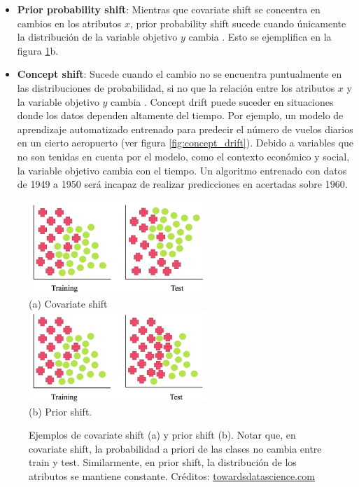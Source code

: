 \begin{itemize}
\item \textbf{Prior probability shift}: Mientras que covariate shift se concentra en cambios en los atributos $x$, prior probability shift sucede cuando únicamente  la distribución de la variable objetivo $y$ cambia \cite{quinonero2009dataset} \cite{MORENOTORRES2012521}. Esto se ejemplifica en la figura \ref{fig:ds_shift_sets}b.
\item \textbf{Concept shift}: Sucede cuando el cambio no se encuentra puntualmente en las distribuciones de probabilidad, si no que la relación entre los atributos $x$ y la variable objetivo $y$ cambia \cite{MORENOTORRES2012521} \cite{kouw2019introduction}. Concept drift puede suceder en situaciones donde los datos dependen altamente del tiempo. Por ejemplo, un modelo de aprendizaje automatizado entrenado para predecir el número de vuelos diarios en un cierto aeropuerto (ver figura \ref{fig:concept_drift}). Debido a variables que no son tenidas en cuenta por el modelo, como el contexto económico y social, la variable objetivo cambia con el tiempo. Un algoritmo entrenado con datos  de 1949 a 1950 será incapaz de realizar predicciones en acertadas sobre 1960.
\end{itemize} 

\begin{figure}[h!]
\centering
  \includegraphics[width=0.6\textwidth]{Kap8/covariate_shift.png} \\
  (a) Covariate shift \\
  \includegraphics[width=0.6\textwidth]{Kap8/prior_shift.png}  \\
  (b) Prior shift.

\caption{Ejemplos de covariate shift (a) y prior shift (b). Notar que, en covariate shift, la probabilidad a priori de las clases no cambia entre train y test. Similarmente, en prior shift, la distribución de los atributos se mantiene constante. Créditos: \url{towardsdatascience.com}}
\label{fig:ds_shift_sets}
\end{figure}

